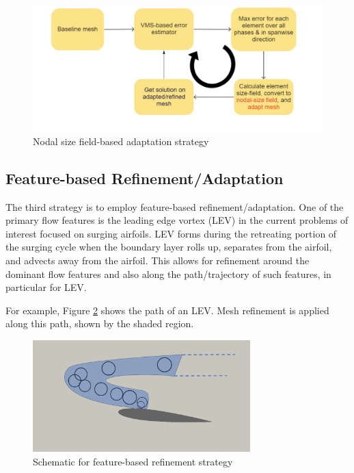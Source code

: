 \begin{figure}[H]
	\centering
	\includegraphics[width=1\textwidth]{figures/adapt_strat/size_based.png}
	\caption{Nodal size field-based adaptation strategy}
	\label{fig:size_based_strat}
\end{figure}

\subsection{Feature-based Refinement/Adaptation}

The third strategy is to employ feature-based refinement/adaptation. 
One of the primary flow features is the leading edge vortex (LEV) in the current problems of interest focused on surging airfoils. LEV forms during the retreating portion of the surging cycle when the boundary layer rolls up, separates from the airfoil, and advects away from the airfoil.
This allows for refinement around the dominant flow features and also along the path/trajectory of such features, in particular for LEV.

For example, Figure \ref{fig:feature_based_strat_schematic} shows the path of an LEV. 
Mesh refinement is applied along this path, shown by the shaded region.
	
\begin{figure}[H]
	\centering
	\includegraphics[width=0.75\textwidth]{figures/adapt_strat/feature_based_schematic.png}
	\caption{Schematic for feature-based refinement strategy}
	\label{fig:feature_based_strat_schematic}
\end{figure}

